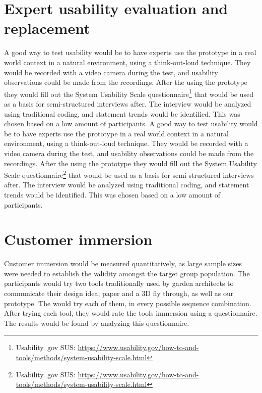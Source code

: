 \section{Expert usability evaluation and replacement}
A good way to test usability would be to have experts use the prototype in a real world context in a natural environment, using a think-out-loud technique. They would be recorded with a video camera during the test, and usability observations could be made from the recordings. After the using the prototype they would fill out the System Usability Scale questionnaire\footnote{Usability. gov SUS:  \url{https://www.usability.gov/how-to-and-tools/methods/system-usability-scale.html}} that would be used as a basis for semi-structured interviews after. The interview would be analyzed using traditional coding, and statement trends would be identified. This was chosen based on a low amount of participants.
A good way to test usability would be to have experts use the prototype in a real world context in a natural environment, using a think-out-loud technique. They would be recorded with a video camera during the test, and usability observations could be made from the recordings. After the using the prototype they would fill out the System Usability Scale questionnaire\footnote{Usability. gov SUS: \url{https://www.usability.gov/how-to-and-tools/methods/system-usability-scale.html}} that would be used as a basis for semi-structured interviews after. The interview would be analyzed using traditional coding, and statement trends would be identified. This was chosen based on a low amount of participants.


\section{Customer immersion}
Customer immersion would be measured quantitatively, as large sample sizes were needed to establish the validity amongst the target group population. The participants would try two tools traditionally used by garden architects to communicate their design idea, paper and a 3D fly through, as well as our prototype. The would try each of them, in every possible sequence combination. After trying each tool, they would rate the tools immersion using a questionnaire. The results would be found by analyzing this questionnaire.